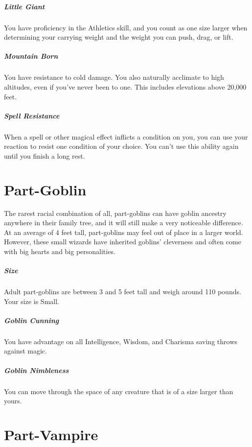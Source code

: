 \documentclass[a4paper,twocolumn,openany,nodeprecatedcode]{dndbook}
\begin{document}
        \subparagraph{Little Giant} You have proficiency in the Athletics skill, and you count as one size larger when determining your carrying weight and the weight you can push, drag, or lift.

        \subparagraph{Mountain Born} You have resistance to cold damage. You also naturally acclimate to high altitudes, even if you've never been to one. This includes elevations above 20,000 feet.


        \subparagraph{Spell Resistance} When a spell or other magical effect inflicts a condition on you, you can use your reaction to resist one condition of your choice. You can't use this ability again until you finish a long rest.


    \section{Part-Goblin}

        The rarest racial combination of all, part-goblins can have goblin ancestry anywhere in their family tree, and it will still make a very noticeable difference. At an average of 4 feet tall, part-goblins may feel out of place in a larger world. However, these small wizards have inherited goblins' cleverness and often come with big hearts and big personalities.

        \subparagraph{Size} Adult part-goblins are between 3 and 5 feet tall and weigh around 110 pounds. Your size is Small.

        \subparagraph{Goblin Cunning} You have advantage on all Intelligence, Wisdom, and Charisma saving throws against magic.

        \subparagraph{Goblin Nimbleness} You can move through the space of any creature that is of a size larger than yours.


    \section{Part-Vampire}
\end{document}

